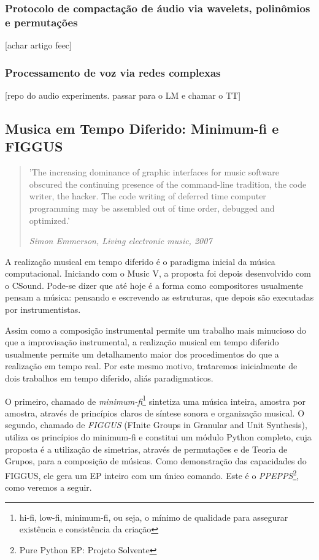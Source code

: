       \subsubsection{Protocolo de compactação de áudio via wavelets, polinômios e permutações}
      [achar artigo feec]


      \subsubsection{Processamento de voz via redes complexas}
      [repo do audio experiments. passar para o LM e chamar o TT]
  



  \subsection{Musica em Tempo Diferido: Minimum-fi e FIGGUS}

\begin{quotation}
\small
'The increasing dominance of graphic interfaces for music software obscured 
the continuing presence of the command-line tradition, 
the code writer, the hacker. The code writing of deferred time 
computer programming may be assembled out of time order, debugged and optimized.'

\emph{Simon Emmerson, Living electronic music, 2007}
\end{quotation}

A realização musical em tempo diferido é o paradigma inicial da música computacional.
Iniciando com o Music V, a proposta foi depois desenvolvido com o CSound. Pode-se dizer
que até hoje é a forma como compositores usualmente pensam a música: pensando
e escrevendo as estruturas, que depois são executadas por instrumentistas.

Assim como a composição instrumental permite um trabalho mais minucioso do que
a improvisação instrumental, a realização musical em tempo diferido usualmente permite um
detalhamento maior dos procedimentos do que a realização em tempo real. Por este
mesmo motivo, trataremos inicialmente de dois trabalhos em tempo diferido,
aliás paradigmaticos.

O primeiro, chamado de \emph{minimum-fi}\footnote{hi-fi, low-fi, minimum-fi, ou seja,
o mínimo de qualidade para assegurar existência e consistência
da criação} sintetiza uma música inteira, amostra por amostra, através de princípios
claros de síntese sonora e organização musical. O segundo, chamado de \emph{FIGGUS} (FInite
Groups in Granular and Unit Synthesis), utiliza os princípios do minimum-fi e constitui
um módulo Python completo, cuja proposta é a utilização de simetrias, através de
permutações e de Teoria de Grupos, para a composição de músicas. Como demonstração
das capacidades do FIGGUS, ele gera um EP inteiro com um único comando. Este é o
\emph{PPEPPS}\footnote{Pure Python EP: Projeto Solvente}, como veremos a seguir.

